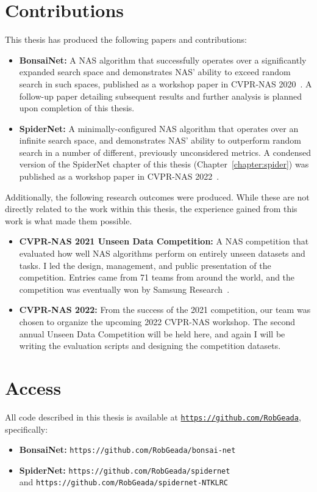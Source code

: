 \section{Contributions}
This thesis has produced the following papers and contributions:
\begin{itemize}[itemsep=-1mm]
    \item \textbf{BonsaiNet:} A NAS algorithm that successfully operates over a significantly expanded search space and
    demonstrates NAS' ability to exceed random search in such spaces, published as a workshop paper in CVPR-NAS 2020~\citep{geada2020}. A follow-up paper
    detailing subsequent results and further analysis is planned upon completion of this thesis.
    \item \textbf{SpiderNet:} A minimally-configured NAS algorithm that operates over an infinite search space,
    and demonstrates NAS' ability to outperform random search in a number of different, previously unconsidered metrics. A condensed version of
    the SpiderNet chapter of this thesis (Chapter~\ref{chapter:spider}) was published as a workshop paper in CVPR-NAS 2022~\citep{geada2022}.
\end{itemize}
\vspace{1em}
Additionally, the following research outcomes were produced. While these are not directly related to the work within this thesis,
the experience gained from this work is what made them possible.
\begin{itemize}[itemsep=-1mm]
    \item \textbf{CVPR-NAS 2021 Unseen Data Competition:} A NAS competition that evaluated how well NAS algorithms perform on entirely unseen datasets and tasks. I led the
    design, management, and public presentation of the competition. Entries came from 71 teams from around the world, and the competition was
    eventually won by Samsung Research~\citep{samsung2021}.
    \item \textbf{CVPR-NAS 2022:} From the success of the 2021 competition, our team was chosen to organize the upcoming 2022 CVPR-NAS workshop. The
    second annual Unseen Data Competition will be held here, and again I will be writing the evaluation scripts and designing
    the competition datasets.
\end{itemize}

\section{Access}
All code described in this thesis is available at \texttt{\url{https://github.com/RobGeada}}, specifically:
\begin{itemize}[itemsep=-2mm]
    \item \textbf{BonsaiNet:} \texttt{https://github.com/RobGeada/bonsai-net}
    \item \textbf{SpiderNet:} \texttt{https://github.com/RobGeada/spidernet} \\and \texttt{https://github.com/RobGeada/spidernet-NTKLRC}
\end{itemize}


